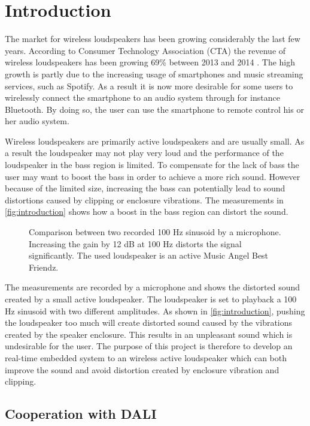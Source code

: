 \chapter{Introduction}

The market for wireless loudspeakers has been growing considerably the last few years. According to Consumer Technology Association (CTA) the revenue of wireless loudspeakers has been growing 69\% between 2013 and 2014 \cite{sou:CTA}. The high growth is partly due to the increasing usage of smartphones and music streaming services, such as Spotify. As a result it is now more desirable for some users to wirelessly connect the smartphone to an audio system through for instance Bluetooth. By doing so, the user can use the smartphone to remote control his or her audio system. 

Wireless loudspeakers are primarily active loudspeakers and are usually small. As a result the loudspeaker may not play very loud and the performance of the loudspeaker in the bass region is limited. To compensate for the lack of bass the user may want to boost the bass in order to achieve a more rich sound. However because of the limited size, increasing the bass can potentially lead to sound distortions caused by clipping or enclosure vibrations. The measurements in \autoref{fig:introduction} shows how a boost in the bass region can distort the sound.

\begin{figure}[H]
\centering
{}

\caption{Comparison between two recorded 100 Hz sinusoid by a microphone. Increasing the gain by 12 dB at 100 Hz distorts the signal significantly. The used loudspeaker is an active Music Angel Best Friendz.}
\label{fig:introduction}
\end{figure}

The measurements are recorded by a microphone and shows the distorted sound created by a small active loudspeaker. The loudspeaker is set to playback a 100 Hz sinusoid with two different amplitudes. As shown in \autoref{fig:introduction}, pushing the loudspeaker too much will create distorted sound caused by the vibrations created by the speaker enclosure. This results in an unpleasant sound which is undesirable for the user. The purpose of this project is therefore to develop an real-time embedded system to an wireless active loudspeaker which can both improve the sound and avoid distortion created by enclosure vibration and clipping.


\section{Cooperation with DALI}

